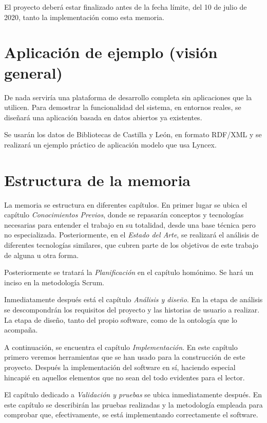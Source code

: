\documentclass[openright,twoside,12pt]{book}
\begin{document}
El proyecto deberá estar finalizado antes de la fecha límite, del 10 de julio de 2020, tanto la implementación como esta memoria.

\section{Aplicación de ejemplo (visión general)}

De nada serviría una plataforma de desarrollo completa sin aplicaciones que la utilicen. Para demostrar la funcionalidad del sistema, en entornos reales, se diseñará una aplicación basada en datos abiertos ya existentes.

Se usarán los datos de Bibliotecas de Castilla y León, en formato RDF/XML y se realizará un ejemplo práctico de aplicación modelo que usa Lyncex.

\section{Estructura de la memoria}
La memoria se estructura en diferentes capítulos. En primer lugar se ubica el capítulo \textit{Conocimientos Previos}, donde se repasarán conceptos y tecnologías necesarias para entender el trabajo en su totalidad, desde una base técnica pero no especializada. Posteriormente, en el \textit{Estado del Arte}, se realizará el análisis de diferentes tecnologías similares, que cubren parte de los objetivos de este trabajo de alguna u otra forma.

Posteriormente se tratará la \textit{Planificación} en el capítulo homónimo. Se hará un inciso en la metodología Scrum. 

Inmediatamente después está el capítulo \textit{Análisis y diseño}. En la etapa de análisis se descompondrán los requisitos del proyecto y las historias de usuario a realizar. La etapa de diseño, tanto del propio software, como de la ontología que lo acompaña. 

A continuación, se encuentra el capítulo \textit{Implementación}. En este capítulo primero veremos herramientas que se han usado para la construcción de este proyecto. Después la implementación del software en sí, haciendo especial hincapié en aquellos elementos que no sean del todo evidentes para el lector.

El capítulo dedicado a \textit{Validación y pruebas} se ubica inmediatamente después. En este capítulo se describirán las pruebas realizadas y la metodología empleada para comprobar que, efectivamente, se está implementando correctamente el software.
\end{document}
